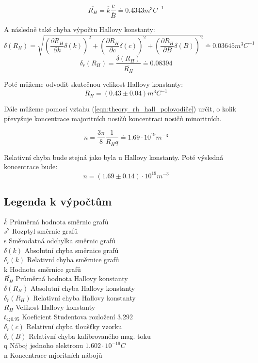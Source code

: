 \documentclass{praktikum}
\begin{document}
\[ \overline{R_H} = \overline{k}\frac{\overline{c}}{\overline{B}} \doteq 0.4343 m^3C^{-1} \]

A následně také chyba výpočtu Hallovy konstanty:
\[ \delta (R_H) = 
\sqrt{\left( \frac{\partial R_H}{\partial k}\delta(k) \right) ^2 +
\left( \frac{\partial R_H}{\partial c}\delta(c) \right) ^2 +
\left( \frac{\partial R_H}{\partial B}\delta(B) \right) ^2
} \doteq 0.03645 m^3C^{-1}  \]
\[ \delta_r (R_H) = \frac{\delta (R_H)}{\overline{R_H}} \doteq 0.08394 \]

Poté můžeme odvodit skutečnou velikost Hallovy konstanty:
\[R_H = (0.43 \pm 0.04) m^3C^{-1} \]

Dále můžeme pomocí vztahu (\ref{eqn:theory_rh_hall_polovodiče}) určit, o kolik převyšuje koncentrace majoritních nosičů koncentraci nosičů minoritních.

\[ n = \frac{3 \pi}{8} \frac{1}{R_Hq} \doteq 1.69 \cdot 10 ^ {19} m ^ {-3}\]

Relativní chyba bude stejná jako byla u Hallovy konstanty. Poté výsledná koncentrace bude:
\[ n = ( 1.69\pm 0.14) \cdot 10 ^ {19} m ^ {-3}\]

\subsection{Legenda k výpočtům}

$\overline{k}$ \dotfill Průměrná hodnota směrnic grafů \\
$s^2$ \dotfill Rozptyl směrnic grafů \\
s \dotfill Směrodatná odchylka směrnic grafů \\
$\delta (k)$ \dotfill Absolutní chyba směrnice grafů \\
$\delta_r (k)$ \dotfill Relativní chyba směrnice grafů \\
k \dotfill Hodnota směrnice grafů \\
$\overline{R_H}$ \dotfill Průměrná hodnota Hallovy konstanty \\
$\delta (R_H)$ \dotfill Absolutní chyba Hallovy konstanty \\
$\delta_r (R_H)$ \dotfill Relativní chyba Hallovy konstanty \\
$R_H$ \dotfill Velikost Hallovy konstanty \\
$t_{4;0.95}$ \dotfill Koeficient Studentova rozložení 3.292 \\
$\delta_r(c)$ \dotfill Relativní chyba tloušťky vzorku \\
$\delta_r(B)$ \dotfill Relativní chyba kalibrovaného mag. toku \\
q \dotfill Náboj jednoho elektronu $1.602\cdot 10^{-19}C$ \\
n \dotfill Koncentrace mjoritních nábojů \\
\end{document}
